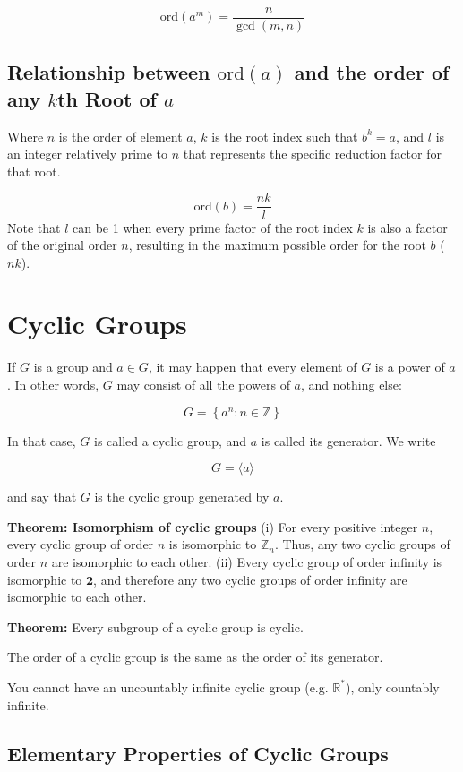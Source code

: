 \documentclass[11pt]{article}
\begin{document}
$$
\text{ord}(a^m) = \frac{n}{\gcd(m, n)}
$$

\subsection{Relationship between $\text{ord}(a)$ and the order of any $k$th Root of $a$
}
Where $n$ is the order of element $a$, $k$ is the root index such that $b^k = a$, and $l$ is an integer relatively prime to $n$ that represents the specific reduction factor for that root.

$$\text{ord}(b) = \frac{nk}{l}$$
Note that $l$ can be 1 when every prime factor of the root index $k$ is also a factor of the original order $n$, resulting in the maximum possible order for the root $b$ ($nk$).

\section{Cyclic Groups}

If $G$ is a group and $a \in G$, it may happen that every element of $G$ is a power of $a$. In other words, $G$ may consist of all the powers of $a$, and nothing else:

$$
G=\left\{a^n: n \in \mathbb{Z}\right\}
$$


In that case, $G$ is called a cyclic group, and $a$ is called its generator. We write

$$
G=\langle a\rangle
$$

and say that $G$ is the cyclic group generated by $a$.

\textbf{Theorem: Isomorphism of cyclic groups}
(i) For every positive integer $n$, every cyclic group of order $n$ is isomorphic to $\mathbb{Z}_n$. Thus, any two cyclic groups of order $n$ are isomorphic to each other.
(ii) Every cyclic group of order infinity is isomorphic to $\mathbf{2}$, and therefore any two cyclic groups of order infinity are isomorphic to each other.

\textbf{Theorem:} Every subgroup of a cyclic group is cyclic.

The order of a cyclic group is the same as the order of its generator.

You cannot have an uncountably infinite cyclic group (e.g. $\mathbb{R}^*$), only countably infinite.

\subsection{Elementary Properties of Cyclic Groups}
\end{document}
